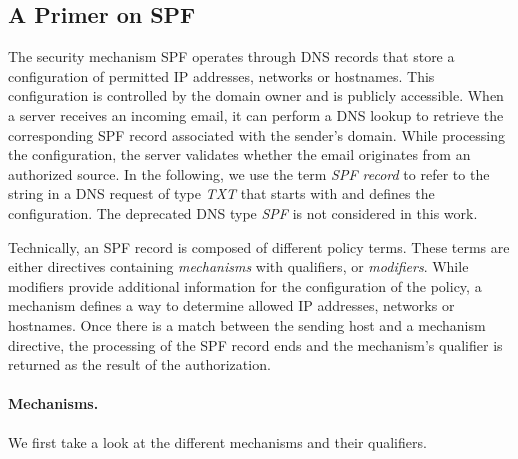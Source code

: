 \subsection{A Primer on SPF}

The security mechanism \ac{SPF} operates through \ac{DNS} records that store a configuration of permitted IP addresses, networks or hostnames. This configuration is controlled by the domain owner and is publicly accessible.
When a server receives an incoming email, it can perform a DNS lookup to retrieve the corresponding \ac{SPF} record associated with the sender's domain.
While processing the configuration, the server validates whether the email originates from an authorized source. 
In the following, we use the term \textit{SPF record} to refer to the string in a DNS request of type \emph{TXT} that starts with  and defines the configuration. The deprecated DNS type \emph{SPF} is not considered in this work.



Technically, an SPF record is composed of different policy terms.
These terms are either directives containing \emph{mechanisms} with qualifiers, or \emph{modifiers}.
While modifiers provide additional information for the configuration of the policy, a mechanism defines a way to determine allowed IP addresses, networks or hostnames.
Once there is a match between the sending host and a mechanism directive, the processing of the SPF record ends and the mechanism's qualifier is returned as the result of the authorization. 

\paragraph{Mechanisms.}
We first take a look at the different mechanisms and their qualifiers.


